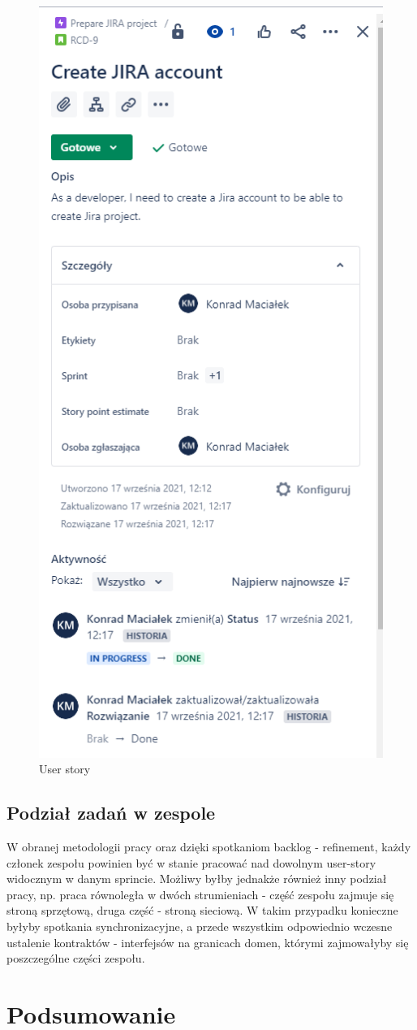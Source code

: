 \documentclass[10pt,a4paper]{article}
\begin{document}
		\begin{figure}[H]
			\centering
			\includegraphics[width=0.5\linewidth]{user_story}
			\caption[User story]{User story}
			\label{fig:userstory}
		\end{figure}
		
		\subsection{Podział zadań w zespole}
		W obranej metodologii pracy oraz dzięki spotkaniom backlog - refinement, każdy członek zespołu powinien być w stanie pracować nad dowolnym user-story widocznym w danym sprincie. Możliwy byłby jednakże również inny podział pracy, np. praca równoległa w dwóch strumieniach - część zespołu zajmuje się stroną sprzętową, druga część - stroną sieciową. W takim przypadku konieczne byłyby spotkania synchronizacyjne, a przede wszystkim odpowiednio wczesne ustalenie kontraktów - interfejsów na granicach domen, którymi zajmowałyby się poszczególne części zespołu.
		
		\section{Podsumowanie}
\end{document}
